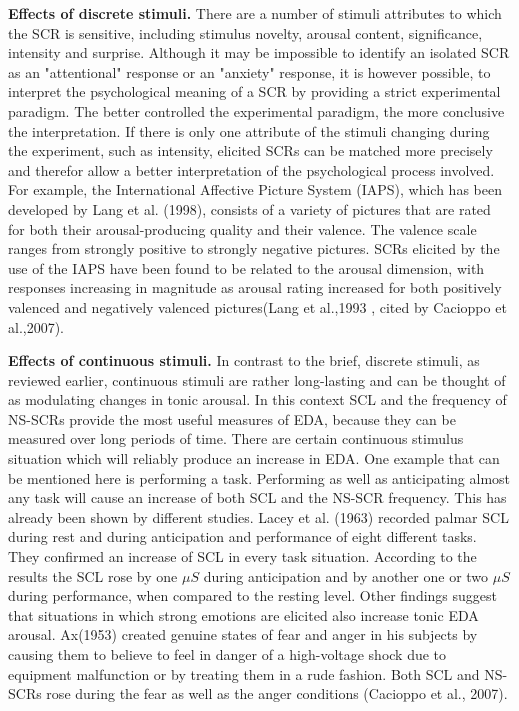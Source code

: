 \textbf{Effects of discrete stimuli.} There are a number of stimuli attributes to which the SCR is sensitive, including stimulus novelty, arousal content, significance, intensity and surprise. Although it may be impossible to identify an isolated SCR as an "attentional" response or an "anxiety" response, it is however possible, to interpret the psychological meaning of a SCR by providing a strict experimental paradigm. The better controlled the experimental paradigm, the more conclusive the interpretation. If there is only one attribute of the stimuli changing during the experiment, such as intensity, elicited SCRs can be matched more precisely and therefor allow a better interpretation of the psychological process involved. For example, the International Affective Picture System (IAPS), which has been developed by Lang et al. (1998), consists of a variety of pictures that are rated for both their arousal-producing quality and their valence. The valence scale ranges from strongly positive to strongly negative pictures. SCRs elicited by the use of the IAPS have been found to be related to the arousal dimension, with responses increasing  in magnitude as arousal rating increased for both positively valenced and negatively valenced pictures(Lang et al.,1993 , cited by Cacioppo et al.,2007). 

\textbf{Effects of continuous stimuli.} In contrast to the brief, discrete stimuli, as reviewed earlier, continuous stimuli are rather long-lasting and can be thought of as modulating changes in tonic arousal. In this context SCL and the frequency of NS-SCRs provide the most useful measures of EDA, because they can be measured over long periods of time. There are certain continuous stimulus situation which will reliably produce an increase in EDA. One example that can be mentioned here is performing a task. Performing as well as anticipating almost any task will cause an increase of both SCL and the NS-SCR frequency. This has already been shown by different studies. Lacey et al. (1963) recorded palmar SCL during rest and during anticipation and performance of eight different tasks. They confirmed an increase of SCL in every task situation. According to the results the SCL rose by one $\mu S$ during anticipation and by another one or two $\mu S$ during performance, when compared to the resting level. Other findings suggest that situations in which strong emotions are elicited also increase tonic EDA arousal. Ax(1953) created genuine states of fear and anger in his subjects by causing them to believe to feel in danger of a high-voltage shock due to equipment malfunction or by treating them in a rude fashion. Both SCL and NS-SCRs rose during the fear as well as the anger conditions (Cacioppo et al., 2007). 

